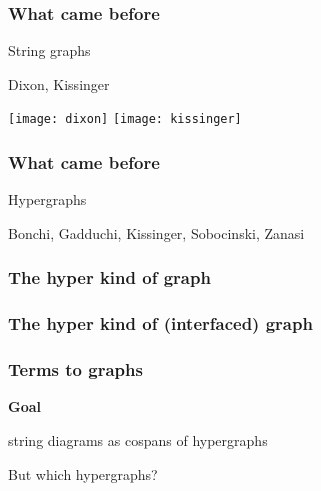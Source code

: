 \begin{frame}
    \frametitle{What came before}

    \await
    \centering
    \LARGE
    String graphs

    \normalsize
    \vspace{1em}
    Dixon, Kissinger

    \texttt{[image: dixon]}
    \texttt{[image: kissinger]}

\end{frame}
\begin{frame}
    \frametitle{What came before}

    \centering
    \LARGE
    Hypergraphs
    \quad

    \normalsize
    \vspace{1em}
    Bonchi, Gadduchi, Kissinger, Sobocinski, Zanasi

    \hypergraphpeople

\end{frame}
\begin{frame}
    \frametitle{The hyper kind of graph}

    \centering

\end{frame}
\begin{frame}
    \frametitle{The hyper kind of (interfaced) graph}

    \centering

\end{frame}
\begin{frame}
    \frametitle{Terms to graphs}

    \centering
    \LARGE

    \textbf{Goal}

    \alert{string diagrams} as \alert{cospans of hypergraphs}

    \vspace{1em}
    \await

    But which hypergraphs?

\end{frame}
